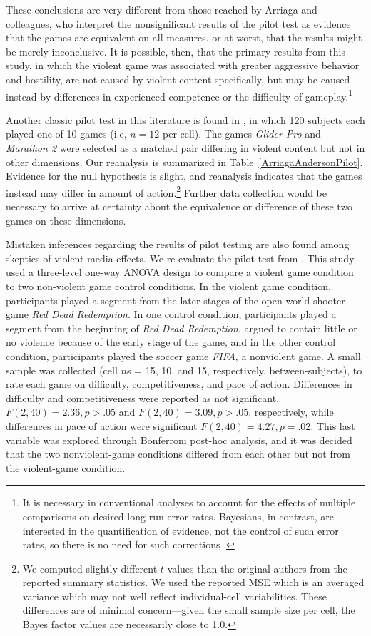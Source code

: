 \documentclass[man]{apa6}
\begin{document}
These conclusions are very different from those reached by Arriaga and colleagues, who interpret the nonsignificant results of the pilot test as evidence that the games are equivalent on all measures, or at worst, that the results might be merely inconclusive.  It is possible, then, that the primary results from this study, in which the violent game was associated with greater aggressive behavior and hostility, are not caused by violent content specifically, but may be caused instead by differences in experienced competence or the difficulty of gameplay.\footnote{It is necessary in conventional analyses to account for the effects of multiple comparisons on desired long-run error rates.  Bayesians, in contrast, are interested in the quantification of evidence, not the control of such error rates, so there is no need for such corrections \citep{Royall:1997,Dienes:2011}.}

Another classic pilot test in this literature is found in \citet[study 1]{Anderson:etal:2004}, in which 120 subjects each played one of 10 games (i.e, $n = 12$ per cell). The games {\em Glider Pro} and {\em Marathon 2} were selected as a matched pair differing in violent content but not in other dimensions. Our reanalysis is summarized in Table~\ref{ArriagaAndersonPilot}. Evidence for the null hypothesis is slight, and reanalysis indicates that the games instead may differ in amount of action.\footnote{We computed slightly different $t$-values than the original authors from the reported summary statistics.  We used the reported MSE which is an averaged variance which may not well reflect individual-cell variabilities.    These differences are of minimal concern---given the small sample size per cell, the Bayes factor values are necessarily close to 1.0.} Further data collection would be necessary to arrive at certainty about the equivalence or difference of these two games on these dimensions. 

Mistaken inferences regarding the results of pilot testing are also found among skeptics of violent media effects. We re-evaluate the pilot test from \citet{Valadez:Ferguson:2012}. This study used a three-level one-way ANOVA design to compare a violent game condition to two non-violent game control conditions. In the violent game condition, participants played a segment from the later stages of the open-world shooter game {\em Red Dead Redemption}. In one control condition, participants played a segment from the beginning of {\em Red Dead Redemption}, argued to contain little or no violence because of the early stage of the game, and in the other control condition, participants played the soccer game {\em FIFA}, a nonviolent game. A small sample was collected (cell $n$s = 15, 10, and 15, respectively, between-subjects), to rate each game on difficulty, competitiveness, and pace of action. Differences in difficulty and competitiveness were reported as not significant, $F(2,40) = 2.36, p > .05$ and $F(2, 40) = 3.09, p > .05$, respectively, while differences in pace of action were significant $F(2, 40) = 4.27, p = .02$. This last variable was explored through Bonferroni post-hoc analysis, and it was decided that the two nonviolent-game conditions differed from each other but not from the violent-game condition. 
\end{document}
